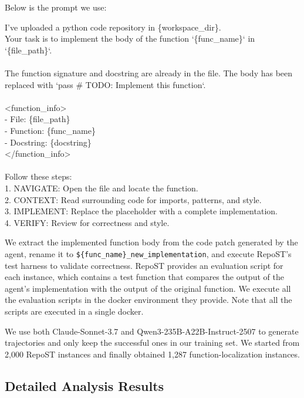 \documentclass{article}
\theoremstyle{plain}
\theoremstyle{definition}
\theoremstyle{remark}
\begin{document}
Below is the prompt we use:
\begin{tcolorbox}[colback=gray!5!white,colframe=gray!75!black,title=Function Generation Prompt,fontupper=\small\ttfamily,breakable]
I've uploaded a python code repository in \{workspace\_dir\}.\\
Your task is to implement the body of the function `\{func\_name\}` in `\{file\_path\}`.\\
\\
The function signature and docstring are already in the file. The body has been replaced with `pass  \# TODO: Implement this function`.\\
\\
<function\_info>\\
- File: \{file\_path\}\\
- Function: \{func\_name\}\\
- Docstring: \{docstring\}\\
</function\_info>\\
\\
Follow these steps:\\
1. NAVIGATE: Open the file and locate the function.\\
2. CONTEXT: Read surrounding code for imports, patterns, and style.\\
3. IMPLEMENT: Replace the placeholder with a complete implementation.\\
4. VERIFY: Review for correctness and style.
\end{tcolorbox}

We extract the implemented function body from the code patch generated by the agent, rename it to \texttt{\$\{func\_name\}\_new\_implementation}, and execute RepoST's test harness to validate correctness.
RepoST provides an evaluation script for each instance, which contains a test function that compares the output of the agent's implementation with the output of the original function.
We execute all the evaluation scripts in the docker environment they provide.
Note that all the scripts are executed in a single docker.

We use both Claude-Sonnet-3.7 and Qwen3-235B-A22B-Instruct-2507 to generate trajectories and only keep the successful ones in our training set.
We started from 2,000 RepoST instances and finally obtained 1,287 function-localization instances.




\newpage
\subsection{Detailed Analysis Results}
\label{app:detailed-analysis-results}
\end{document}
